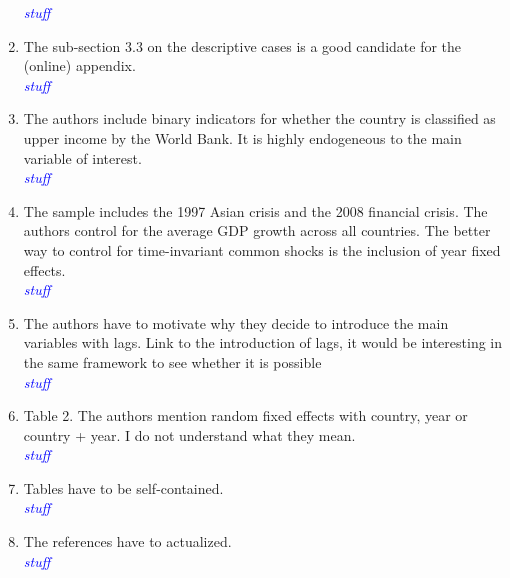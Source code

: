 \begin{enumerate}
\textcolor{blue}{\emph{
	stuff
}}

\item The sub-section 3.3 on the descriptive cases is a good candidate for the (online) appendix. \\

\textcolor{blue}{\emph{
	stuff
}}

\item  The authors include binary indicators for whether the country is classified as upper income by the World Bank. It is highly endogeneous to the main variable of interest. \\

\textcolor{blue}{\emph{
	stuff
}}

\item The sample includes the 1997 Asian crisis and the 2008 financial crisis. The authors control for the average GDP growth across all countries. The better way to control for time-invariant common shocks is the inclusion of year fixed effects. \\

\textcolor{blue}{\emph{
	stuff
}}

\item The authors have to motivate why they decide to introduce the main variables with lags. Link to the introduction of lags, it would be interesting in the same framework to see whether it is possible \\

\textcolor{blue}{\emph{
	stuff
}}

\item Table 2. The authors mention random fixed effects with country, year or country + year. I do not understand what they mean. \\

\textcolor{blue}{\emph{
	stuff
}}

\item Tables have to be self-contained. \\

\textcolor{blue}{\emph{
	stuff
}}

\item The references have to actualized. \\

\textcolor{blue}{\emph{
	stuff
}}

\end{enumerate}